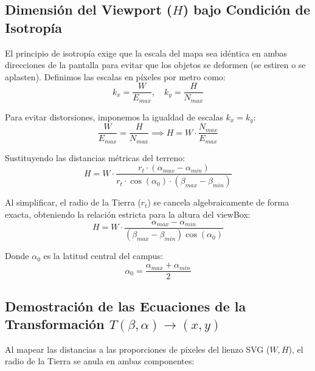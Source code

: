 \documentclass[12pt,a4paper]{article}
\begin{document}
\subsection{Dimensión del Viewport ($H$) bajo Condición de Isotropía}

El principio de isotropía exige que la escala del mapa sea idéntica en ambas direcciones de la pantalla para evitar que los objetos se deformen (se estiren o se aplasten). Definimos las escalas en píxeles por metro como:
\begin{equation}
    k_x = \frac{W}{E_{max}}, \quad k_y = \frac{H}{N_{max}}
\end{equation}

Para evitar distorsiones, imponemos la igualdad de escalas $k_x = k_y$:
\begin{equation}
    \frac{W}{E_{max}} = \frac{H}{N_{max}} \implies H = W \cdot \frac{N_{max}}{E_{max}}
\end{equation}

Sustituyendo las distancias métricas del terreno:
\begin{equation}
    H = W \cdot \frac{r_t \cdot (\alpha_{max} - \alpha_{min})}{r_t \cdot \cos(\alpha_0) \cdot (\beta_{max} - \beta_{min})}
\end{equation}

Al simplificar, el radio de la Tierra ($r_t$) se cancela algebraicamente de forma exacta, obteniendo la relación estricta para la altura del viewBox:
\begin{equation}
    H = W \cdot \frac{\alpha_{max} - \alpha_{min}}{(\beta_{max} - \beta_{min}) \cos(\alpha_0)}
\end{equation}

Donde $\alpha_0$ es la latitud central del campus:
\begin{equation}
    \alpha_0 = \frac{\alpha_{max} + \alpha_{min}}{2}
\end{equation}

\subsection{Demostración de las Ecuaciones de la Transformación $T(\beta,\alpha) \to (x,y)$}

Al mapear las distancias a las proporciones de píxeles del lienzo SVG ($W,H$), el radio de la Tierra se anula en ambas componentes:
\end{document}
